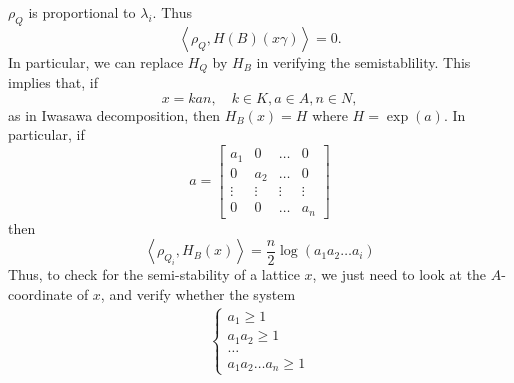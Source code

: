 $\rho_Q$ is proportional to $\lambda_i.$ Thus $$\left\langle \rho_Q,H(B)(x\gamma)\right\rangle =0.$$ In particular, we can replace $H_Q$ by $H_B$ in verifying the semistablility.
This implies that, if
\[ x = kan, \quad k \in K, a \in A, n \in N,\]
as in Iwasawa decomposition, then $H_B(x) = H$ where $H = \exp(a)$. In particular, if
\[a = \begin{bmatrix}
        a_1    & 0      & \ldots & 0      \\
        0      & a_2    & \ldots & 0      \\
        \vdots & \vdots & \vdots & \vdots \\
        0      & 0      & \ldots & a_n
    \end{bmatrix}\]
then
\[\left\langle \rho_{Q_i}, H_B(x) \right\rangle = \dfrac{n}{2}\log(a_1a_2\ldots a_i)\]
Thus, to check for the semi-stability of a lattice $x$, we just need to look at the
$A$-coordinate of $x$, and verify whether the system
\begin{align*}
    \begin{cases}
        a_1 \ge 1   \\
        a_1a_2\ge 1 \\
        \ldots      \\
        a_1a_2\ldots a_n \ge 1
    \end{cases}
\end{align*}

